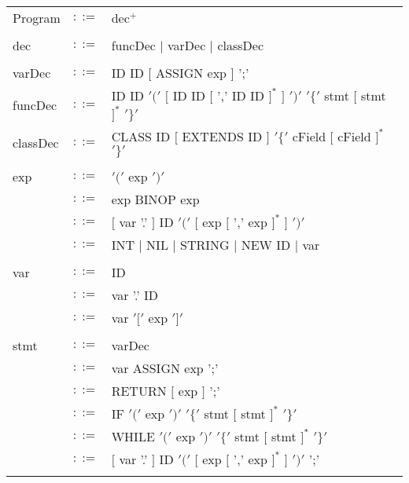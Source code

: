 \documentclass{article}
\begin{document}
\begin{table}[h]
\centering
\begin{tabular}{ l c l }
  Program     & $::=$ & dec$^{+}$                                           \\ \\

  dec         & $::=$ & funcDec $|$ varDec $|$ classDec                       \\ \\

  varDec      & $::=$ & ID ID $[$ ASSIGN exp $]$ ';'                              \\
  funcDec     & $::=$ & ID ID $'('$ $[$ ID ID $[$ ',' ID ID $]^{*}$ $]$ $')'$
                              $'\{'$ stmt   $[$ stmt $]^{*}$ $'\}'$           \\
  classDec    & $::=$ & CLASS ID $[$ EXTENDS ID $]$
                               $'\{'$ cField $[$ cField $]^{*}$ $'\}'$      \\ \\

  exp         & $::=$ & $'('$ exp $')'$                                     \\
              & $::=$ & exp BINOP exp                                       \\
              & $::=$ & $[$ var '.' $]$ ID $'('$ $[$ exp $[$ ',' exp $]^{*}$ $]$ $')'$ \\
              & $::=$ & INT $|$ NIL $|$ STRING $|$ NEW ID $|$ var           \\ \\
  var         & $::=$ & ID                                                        \\
              & $::=$ & var '.' ID                                                \\
              & $::=$ & var $'['$ exp $']'$                                       \\ \\
  
  stmt        & $::=$ & varDec                                                             \\
              & $::=$ & var ASSIGN exp ';'                                                 \\
              & $::=$ & RETURN $[$ exp $]$ ';'                                             \\
              & $::=$ & IF $'('$ exp $')'$ $'\{'$ stmt $[$ stmt $]^{*}$ $'\}'$             \\
              & $::=$ & WHILE $'('$ exp $')'$ $'\{'$ stmt $[$ stmt $]^{*}$ $'\}'$          \\
              & $::=$ & $[$ var '.' $]$ ID $'('$ $[$ exp $[$ ',' exp $]^{*}$ $]$ $')'$ ';' \\ \\


\end{tabular}
\end{table}
\end{document}
